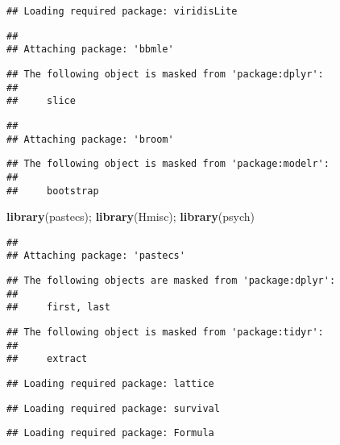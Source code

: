 \documentclass[]{article}
\newenvironment{Shaded}{\begin{snugshade}}{\end{snugshade}}
\newcommand{\KeywordTok}[1]{\textcolor[rgb]{0.13,0.29,0.53}{\textbf{#1}}}
\newcommand{\NormalTok}[1]{#1}
\begin{document}
\begin{verbatim}
## Loading required package: viridisLite
\end{verbatim}

\begin{verbatim}
## 
## Attaching package: 'bbmle'
\end{verbatim}

\begin{verbatim}
## The following object is masked from 'package:dplyr':
## 
##     slice
\end{verbatim}

\begin{verbatim}
## 
## Attaching package: 'broom'
\end{verbatim}

\begin{verbatim}
## The following object is masked from 'package:modelr':
## 
##     bootstrap
\end{verbatim}

\begin{Shaded}
\begin{Highlighting}[]
\KeywordTok{library}\NormalTok{(pastecs); }\KeywordTok{library}\NormalTok{(Hmisc); }\KeywordTok{library}\NormalTok{(psych)}
\end{Highlighting}
\end{Shaded}

\begin{verbatim}
## 
## Attaching package: 'pastecs'
\end{verbatim}

\begin{verbatim}
## The following objects are masked from 'package:dplyr':
## 
##     first, last
\end{verbatim}

\begin{verbatim}
## The following object is masked from 'package:tidyr':
## 
##     extract
\end{verbatim}

\begin{verbatim}
## Loading required package: lattice
\end{verbatim}

\begin{verbatim}
## Loading required package: survival
\end{verbatim}

\begin{verbatim}
## Loading required package: Formula
\end{verbatim}
\end{document}
